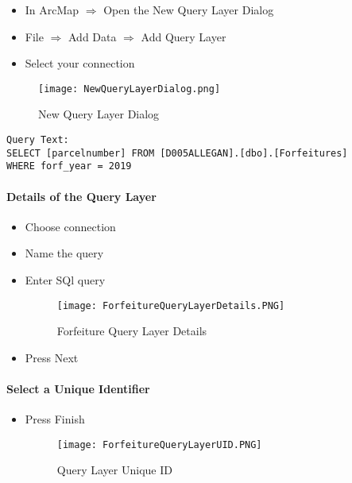 \begin{itemize}
\item In ArcMap $\Rightarrow$ {\Large Open the New Query Layer Dialog}
\item {\Large File $\Rightarrow$ Add Data $\Rightarrow$ Add Query Layer}
\item {\Large Select your connection}
\end{itemize}
\vspace{.25in}
\begin{figure}[h!]
\centering
    \texttt{[image: NewQueryLayerDialog.png]}
\caption{New Query Layer Dialog}
\end{figure}
\begin{verbatim}
Query Text:
SELECT [parcelnumber] FROM [D005ALLEGAN].[dbo].[Forfeitures]
WHERE forf_year = 2019
\end{verbatim}
\clearpage
\paragraph[Details of the Query Layer]{Details of the Query Layer \texorpdfstring{\\}{}}
\begin{itemize}
\item Choose connection
\item Name the query
\item Enter SQl query
\begin{figure}[h!]
\centering
    \texttt{[image: ForfeitureQueryLayerDetails.PNG]}
\caption{Forfeiture Query Layer Details}
\end{figure}
\item Press Next
\end{itemize}
\clearpage
\paragraph[Select a Unique Identifier]{Select a Unique Identifier\texorpdfstring{\\}{}}
\begin{itemize}
\item Press Finish
\begin{figure}[h!]
\centering
    \texttt{[image: ForfeitureQueryLayerUID.PNG]}
\caption{Query Layer Unique ID}
\end{figure}
\end{itemize}
\clearpage
